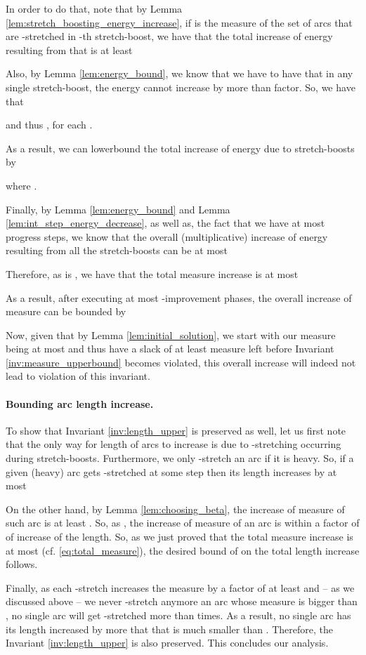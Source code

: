 \documentclass[11pt, letterpaper]{article}
\begin{document}
In order to do that, note that by Lemma \ref{lem:stretch_boosting_energy_increase}, if  is the measure of the set of arcs that are -stretched in -th stretch-boost, we have that the total increase of energy resulting from that is at least

Also, by Lemma \ref{lem:energy_bound}, we know that we have to have that in any single stretch-boost, the energy cannot increase by more than  factor. So, we have that

and thus , for each . 

As a result, we can lowerbound the total increase of energy due to stretch-boosts by

where . 

Finally, by Lemma \ref{lem:energy_bound} and Lemma \ref{lem:int_step_energy_decrease}, as well as, the fact that we have at most  progress steps, we know that the overall (multiplicative) increase of energy resulting from all the stretch-boosts can be at most

Therefore, as  is , we have that the total measure increase  is at most
 
As a result, after executing at most  -improvement phases, the overall increase of measure can be bounded by

Now, given that by Lemma \ref{lem:initial_solution}, we start with our measure being at most  and thus have a slack of at least  measure left before Invariant \ref{inv:measure_upperbound} becomes violated, this overall increase will indeed not lead to violation of this invariant.

\paragraph{Bounding arc length increase.} To show that Invariant \ref{inv:length_upper} is preserved as well, let us first note that the only way for length of arcs to increase is due to -stretching occurring during stretch-boosts. Furthermore, we only -stretch an arc if it is heavy. So, if a given (heavy) arc  gets -stretched at some step  then its length increases by at most
 
On the other hand, by Lemma \ref{lem:choosing_beta}, the increase of measure of such arc is at least . So, as , the increase of measure of an arc is within a factor of  of increase of the length. So, as we just proved that the total measure increase is at most  (cf. \eqref{eq:total_measure}), the desired bound of  on the total length increase follows. 

Finally, as each -stretch increases the measure by a factor of at least  and -- as we discussed above -- we never -stretch anymore an arc whose measure is bigger than , no single arc will get -stretched more than  times. As a result, no single arc has its length increased by more that  that is much smaller than . Therefore, the Invariant \ref{inv:length_upper} is also preserved. This concludes our analysis. 
 
\end{document}
